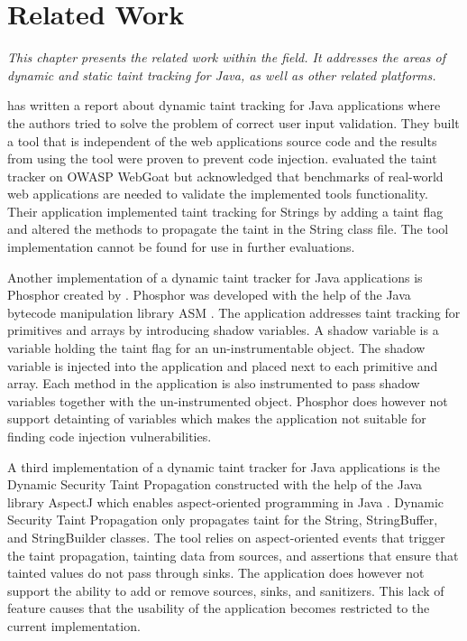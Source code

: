 \chapter{Related Work}
\label{RW}
\textit{This chapter presents the related work within the field. It addresses the areas of dynamic and static taint tracking for Java, as well as other related platforms.}

\textcite{Haldar} has written a report about dynamic taint tracking for Java applications where the authors tried to solve the problem of correct user input validation. They built a tool that is independent of the web applications source code and the results from using the tool were proven to prevent code injection. \textcite{Haldar} evaluated the taint tracker on OWASP WebGoat \parencite{webgoat} but acknowledged that benchmarks of real-world web applications are needed to validate the implemented tools functionality. Their application implemented taint tracking for Strings by adding a taint flag and altered the methods to propagate the taint in the String class file. The tool \textcite{Haldar} implementation cannot be found for use in further evaluations.

Another implementation of a dynamic taint tracker for Java applications is Phosphor \parencite{phosphor} created by \textcite{BellJ.2014PIdd}. Phosphor was developed with the help of the Java bytecode manipulation library ASM \parencite{asm}. The application addresses taint tracking for primitives and arrays by introducing shadow variables. A shadow variable is a variable holding the taint flag for an un-instrumentable object. The shadow variable is injected into the application and placed next to each primitive and array. Each method in the application is also instrumented to pass shadow variables together with the un-instrumented object. Phosphor does however not support detainting of variables \parencite{BellJ.2014PIdd} which makes the application not suitable for finding code injection vulnerabilities. 

A third implementation of a dynamic taint tracker for Java applications is the Dynamic Security Taint Propagation \parencite{securityTaint} constructed with the help of the Java library AspectJ which enables aspect-oriented programming in Java \parencite{aspectj}. Dynamic Security Taint Propagation only propagates taint for the String, StringBuffer, and StringBuilder classes. The tool relies on aspect-oriented events that trigger the taint propagation, tainting data from sources, and assertions that ensure that tainted values do not pass through sinks. The application does however not support the ability to add or remove sources, sinks, and sanitizers. This lack of feature causes that the usability of the application becomes restricted to the current implementation.

